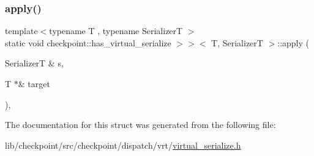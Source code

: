 \subsubsection{\texorpdfstring{apply()}{apply()}}
{\footnotesize\ttfamily template$<$typename T , typename SerializerT $>$ \\
static void checkpoint\+::has\+\_\+virtual\+\_\+serialize $>$$>$$<$ T, SerializerT $>$\+::apply (\begin{DoxyParamCaption}\item[{SerializerT \&}]{s,  }\item[{T $\ast$\&}]{target }\end{DoxyParamCaption})\hspace{0.3cm}{\ttfamily [inline]}, {\ttfamily [static]}}



The documentation for this struct was generated from the following file\+:\begin{DoxyCompactItemize}
\item 
lib/checkpoint/src/checkpoint/dispatch/vrt/\hyperlink{virtual__serialize_8h}{virtual\+\_\+serialize.\+h}\end{DoxyCompactItemize}
